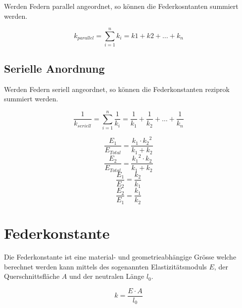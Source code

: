 \noindent
Werden Federn parallel angeordnet, so können die Federkosntanten summiert 
werden.

\[ \boxed{k_{parallel} = \sum_{i=1}^n k_i = k1 + k2 + \dots + k_n} \]

\subsection{Serielle Anordnung}

\noindent
Werden Federn seriell angeordnet, so können die Federkonstanten reziprok 
summiert werden.

\[ \boxed{\frac{1}{k_{seriell}} = \sum_{i=1}^n \frac{1}{k_i} = 
	\frac{1}{k_1} + \frac{1}{k_2} + \dots + \frac{1}{k_n}} \]

\[ \boxed{\frac{E_1}{E_{Total}} = \frac{k_1 \cdot {k_2}^2}{k_1 + k_2}} \]  
\[ \boxed{\frac{E_2}{E_{Total}} = \frac{{k_1}^2 \cdot k_2}{k_1 + k_2}} \]  
\[ \boxed{\frac{E_1}{E_2} = \frac{k_2}{k_1}} \]
\[ \boxed{\frac{E_2}{E_1} = \frac{k_1}{k_2}} \]

\section{Federkonstante}
Die Federkonstante ist eine material- und geometrieabhängige Grösse welche
berechnet werden kann mittels des sogenannten Elastizitätsmoduls $E$, der
Querschnittsfläche $A$ und der neutralen Länge $l_0$.

\[ \boxed{k = \frac{E \cdot A}{l_0}} \]

